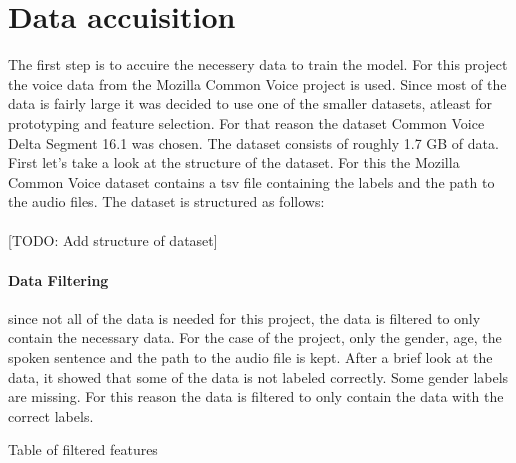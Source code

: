 \section{Data accuisition}

    The first step is to accuire the necessery data to train the model. For this project the voice data from the Mozilla Common Voice project is used. Since most of the data is fairly large it was decided to use one of the smaller datasets, atleast for prototyping and feature selection. For that reason the dataset Common Voice Delta Segment 16.1 was chosen. The dataset consists of roughly 1.7 GB of data. First let's take a look at the structure of the dataset. For this the Mozilla Common Voice dataset contains a tsv file containing the labels and the path to the audio files. 
    \break
    The dataset is structured as follows:
    
    \paragraph{}
    [TODO: Add structure of dataset]

    \paragraph{Data Filtering}
    since not all of the data is needed for this project, the data is filtered to only contain the necessary data. For the case of the project, only the gender, age, the spoken sentence and the path to the audio file is kept. After a brief look at the data, it showed that some of the data is not labeled correctly. Some gender labels are missing. For this reason the data is filtered to only contain the data with the correct labels.

    \begin{table}[h!]
        \begin{adjustbox}{max width=\textwidth}
        \end{adjustbox}
        \caption{Table of filtered features}
    \end{table}

